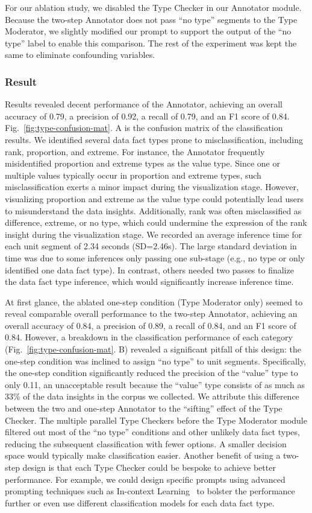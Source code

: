 For our ablation study, we disabled the Type Checker in our Annotator module. Because the two-step Annotator does not pass ``no type'' segments to the Type Moderator, we slightly modified our prompt to support the output of the ``no type'' label to enable this comparison. The rest of the experiment was kept the same to eliminate confounding variables.

\subsubsection{Result}

Results revealed decent performance of the Annotator, achieving an overall accuracy of 0.79, a precision of 0.92, a recall of 0.79, and an F1 score of 0.84. Fig.~\ref{fig:type-confusion-mat}. A is the confusion matrix of the classification results. We identified several data fact types prone to misclassification, including rank, proportion, and extreme. For instance, the Annotator frequently misidentified proportion and extreme types as the value type. Since one or multiple values typically occur in proportion and extreme types, such misclassification exerts a minor impact during the visualization stage. However, visualizing proportion and extreme as the value type could potentially lead users to misunderstand the data insights. Additionally, rank was often misclassified as difference, extreme, or no type, which could undermine the expression of the rank insight during the visualization stage. We recorded an average inference time for each unit segment of 2.34 seconds (SD=2.46s). The large standard deviation in time was due to some inferences only passing one sub-stage (e.g., no type or only identified one data fact type). In contrast, others needed two passes to finalize the data fact type inference, which would significantly increase inference time.

At first glance, the ablated one-step condition (Type Moderator only) seemed to reveal comparable overall performance to the two-step Annotator, achieving an overall accuracy of 0.84, a precision of 0.89, a recall of 0.84, and an F1 score of 0.84. However, a breakdown in the classification performance of each category (Fig.~\ref{fig:type-confusion-mat}. B) revealed a significant pitfall of this design: the one-step condition was inclined to assign ``no type'' to unit segments. Specifically, the one-step condition significantly reduced the precision of the ``value'' type to only 0.11, an unacceptable result because the ``value'' type consists of as much as 33\% of the data insights in the corpus we collected. We attribute this difference between the two and one-step Annotator to the ``sifting'' effect of the Type Checker. The multiple parallel Type Checkers before the Type Moderator module filtered out most of the ``no type'' conditions and other unlikely data fact types, reducing the subsequent classification with fewer options. A smaller decision space would typically make classification easier. Another benefit of using a two-step design is that each Type Checker could be bespoke to achieve better performance. For example, we could design specific prompts using advanced prompting techniques such as In-context Learning~\cite{yao2024more} to bolster the performance further or even use different classification models for each data fact type.
